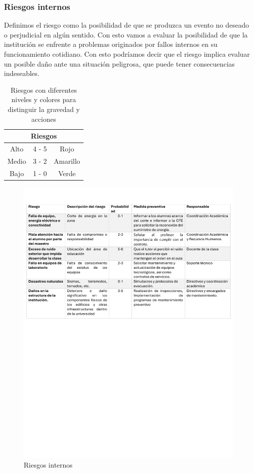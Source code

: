     \subsubsection{Riesgos internos}
   Definimos el riesgo como la posibilidad de que se produzca un evento no deseado o perjudicial en algún sentido. Con esto vamos a evaluar la posibilidad de que la institución se enfrente a problemas originados por fallos internos en su funcionamiento cotidiano. Con esto podríamos decir que el riesgo implica evaluar un posible daño ante una situación peligrosa, que puede tener consecuencias indeseables.
    \begin{table}[h]
    \centering
    \caption{Riesgos con diferentes niveles y colores para distinguir la gravedad y acciones}
    \begin{tabular}{c c c}
    \hline
    \multicolumn{3}{c}{Riesgos}\\
    \hline
         Alto& 4 - 5 & Rojo  \\
    \hline
         Medio& 3 - 2 & Amarillo  \\
    \hline
         Bajo& 1 - 0 & Verde \\
    \hline     
    \end{tabular}
    \label{tab:riego}
\end{table}
%
%
\begin{figure}[H]
        \centering
        \includegraphics[trim = {5mm 5mm 5mm 15mm},clip,scale=0.42]{16/Img/riesgosinternosITQ.pdf}
        \caption{Riesgos internos}
        \label{Riesgos internos}
    \end{figure}
%
%
